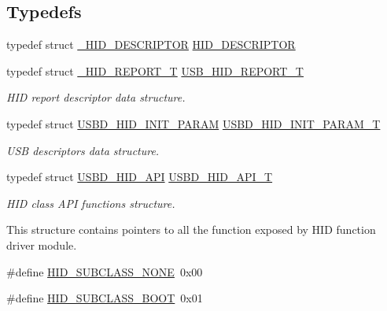 \subsection*{Typedefs}
\begin{DoxyCompactItemize}
\item 
typedef struct \hyperlink{struct___h_i_d___d_e_s_c_r_i_p_t_o_r}{\+\_\+\+H\+I\+D\+\_\+\+D\+E\+S\+C\+R\+I\+P\+T\+OR} \hyperlink{group___u_s_b_d___h_i_d_ga683d4339556ecbba7d2062c3f90336e8}{H\+I\+D\+\_\+\+D\+E\+S\+C\+R\+I\+P\+T\+OR}
\item 
typedef struct \hyperlink{struct___h_i_d___r_e_p_o_r_t___t}{\+\_\+\+H\+I\+D\+\_\+\+R\+E\+P\+O\+R\+T\+\_\+T} \hyperlink{group___u_s_b_d___h_i_d_gaaa1686adb431783ea4357e6899c0d39d}{U\+S\+B\+\_\+\+H\+I\+D\+\_\+\+R\+E\+P\+O\+R\+T\+\_\+T}
\begin{DoxyCompactList}\small\item\em H\+ID report descriptor data structure. \end{DoxyCompactList}\item 
typedef struct \hyperlink{struct_u_s_b_d___h_i_d___i_n_i_t___p_a_r_a_m}{U\+S\+B\+D\+\_\+\+H\+I\+D\+\_\+\+I\+N\+I\+T\+\_\+\+P\+A\+R\+AM} \hyperlink{group___u_s_b_d___h_i_d_ga192251fa5ec461eaa9a77b76dbe7c3fa}{U\+S\+B\+D\+\_\+\+H\+I\+D\+\_\+\+I\+N\+I\+T\+\_\+\+P\+A\+R\+A\+M\+\_\+T}
\begin{DoxyCompactList}\small\item\em U\+SB descriptors data structure. \end{DoxyCompactList}\item 
typedef struct \hyperlink{struct_u_s_b_d___h_i_d___a_p_i}{U\+S\+B\+D\+\_\+\+H\+I\+D\+\_\+\+A\+PI} \hyperlink{group___u_s_b_d___h_i_d_ga48d7b7f66a852d99dfbe2c419cc408ba}{U\+S\+B\+D\+\_\+\+H\+I\+D\+\_\+\+A\+P\+I\+\_\+T}
\begin{DoxyCompactList}\small\item\em H\+ID class A\+PI functions structure.

This structure contains pointers to all the function exposed by H\+ID function driver module. \end{DoxyCompactList}\end{DoxyCompactItemize}
\begin{DoxyCompactItemize}
\item 
\#define \hyperlink{group___u_s_b_d___h_i_d_ga1f7d3e3accc103eee60cb9a9162a7c49}{H\+I\+D\+\_\+\+S\+U\+B\+C\+L\+A\+S\+S\+\_\+\+N\+O\+NE}~0x00
\item 
\#define \hyperlink{group___u_s_b_d___h_i_d_ga7f90b6b8acd0bce821f59ca15625da3a}{H\+I\+D\+\_\+\+S\+U\+B\+C\+L\+A\+S\+S\+\_\+\+B\+O\+OT}~0x01
\end{DoxyCompactItemize}
